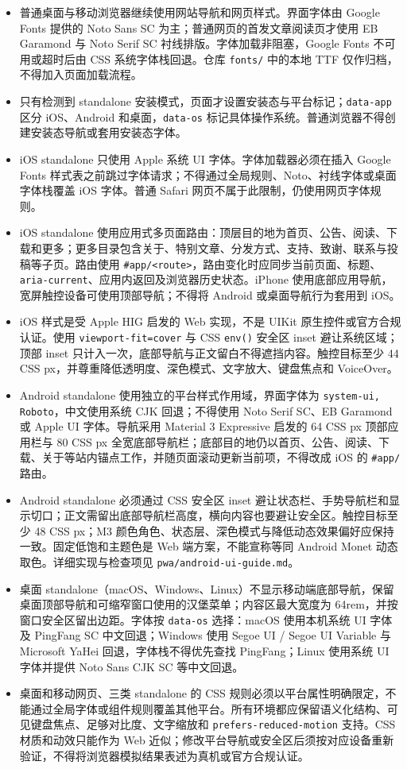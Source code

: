 \documentclass[fontset=fandol]{ctexrep}
\begin{document}
\begin{itemize}
	\item{普通桌面与移动浏览器继续使用网站导航和网页样式。界面字体由 Google Fonts 提供的 Noto Sans SC 为主；普通网页的首发文章阅读页才使用 EB Garamond 与 Noto Serif SC 衬线排版。字体加载非阻塞，Google Fonts 不可用或超时后由 CSS 系统字体栈回退。仓库 \verb|fonts/| 中的本地 TTF 仅作归档，不得加入页面加载流程。}
	\item{只有检测到 standalone 安装模式，页面才设置安装态与平台标记；\verb|data-app| 区分 iOS、Android 和桌面，\verb|data-os| 标记具体操作系统。普通浏览器不得创建安装态导航或套用安装态字体。}
	\item{iOS standalone 只使用 Apple 系统 UI 字体。字体加载器必须在插入 Google Fonts 样式表之前跳过字体请求；不得通过全局规则、Noto、衬线字体或桌面字体栈覆盖 iOS 字体。普通 Safari 网页不属于此限制，仍使用网页字体规则。}
	\item{iOS standalone 使用应用式多页面路由：顶层目的地为首页、公告、阅读、下载和更多；更多目录包含关于、特别文章、分发方式、支持、致谢、联系与投稿等子页。路由使用 \verb|#app/<route>|，路由变化时应同步当前页面、标题、\verb|aria-current|、应用内返回及浏览器历史状态。iPhone 使用底部应用导航，宽屏触控设备可使用顶部导航；不得将 Android 或桌面导航行为套用到 iOS。}
	\item{iOS 样式是受 Apple HIG 启发的 Web 实现，不是 UIKit 原生控件或官方合规认证。使用 \verb|viewport-fit=cover| 与 CSS \verb|env()| 安全区 inset 避让系统区域；顶部 inset 只计入一次，底部导航与正文留白不得遮挡内容。触控目标至少 44 CSS px，并尊重降低透明度、深色模式、文字放大、键盘焦点和 VoiceOver。}
	\item{Android standalone 使用独立的平台样式作用域，界面字体为 \verb|system-ui, Roboto|，中文使用系统 CJK 回退；不得使用 Noto Serif SC、EB Garamond 或 Apple UI 字体。导航采用 Material 3 Expressive 启发的 64 CSS px 顶部应用栏与 80 CSS px 全宽底部导航栏；底部目的地仍以首页、公告、阅读、下载、关于等站内锚点工作，并随页面滚动更新当前项，不得改成 iOS 的 \verb|#app/| 路由。}
	\item{Android standalone 必须通过 CSS 安全区 inset 避让状态栏、手势导航栏和显示切口；正文需留出底部导航栏高度，横向内容也要避让安全区。触控目标至少 48 CSS px；M3 颜色角色、状态层、深色模式与降低动态效果偏好应保持一致。固定低饱和主题色是 Web 端方案，不能宣称等同 Android Monet 动态取色。详细实现与检查项见 \verb|pwa/android-ui-guide.md|。}
	\item{桌面 standalone（macOS、Windows、Linux）不显示移动端底部导航，保留桌面顶部导航和可缩窄窗口使用的汉堡菜单；内容区最大宽度为 64rem，并按窗口安全区留出边距。字体按 \verb|data-os| 选择：macOS 使用本机系统 UI 字体及 PingFang SC 中文回退；Windows 使用 Segoe UI / Segoe UI Variable 与 Microsoft YaHei 回退，字体栈不得优先查找 PingFang；Linux 使用系统 UI 字体并提供 Noto Sans CJK SC 等中文回退。}
	\item{桌面和移动网页、三类 standalone 的 CSS 规则必须以平台属性明确限定，不能通过全局字体或组件规则覆盖其他平台。所有环境都应保留语义化结构、可见键盘焦点、足够对比度、文字缩放和 \verb|prefers-reduced-motion| 支持。CSS 材质和动效只能作为 Web 近似；修改平台导航或安全区后须按对应设备重新验证，不得将浏览器模拟结果表述为真机或官方合规认证。}
\end{itemize}
\end{document}
